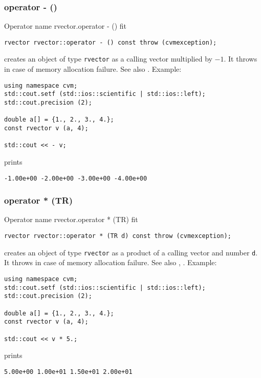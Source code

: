 \subsubsection{operator - ()}
Operator%
\pdfdest name {rvector.operator - ()} fit
\begin{verbatim}
rvector rvector::operator - () const throw (cvmexception);
\end{verbatim}
creates an object of type \verb"rvector" as
a calling vector multiplied by $-1$.
It throws  
in case of memory allocation failure.
See also .
Example:
\begin{Verbatim}
using namespace cvm;
std::cout.setf (std::ios::scientific | std::ios::left); 
std::cout.precision (2);

double a[] = {1., 2., 3., 4.};
const rvector v (a, 4);

std::cout << - v;
\end{Verbatim}
prints
\begin{Verbatim}
-1.00e+00 -2.00e+00 -3.00e+00 -4.00e+00
\end{Verbatim}
\newpage


\subsubsection{operator * (TR)}
Operator%
\pdfdest name {rvector.operator * (TR)} fit
\begin{verbatim}
rvector rvector::operator * (TR d) const throw (cvmexception);
\end{verbatim}
creates an object of type \verb"rvector" as a product of
a calling vector and number \verb"d".
It throws  
in case of memory allocation failure.
See also ,
.
Example:
\begin{Verbatim}
using namespace cvm;
std::cout.setf (std::ios::scientific | std::ios::left); 
std::cout.precision (2);

double a[] = {1., 2., 3., 4.};
const rvector v (a, 4);

std::cout << v * 5.;
\end{Verbatim}
prints
\begin{Verbatim}
5.00e+00 1.00e+01 1.50e+01 2.00e+01
\end{Verbatim}
\newpage


